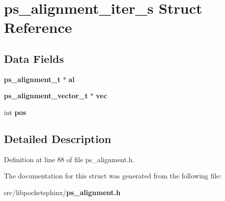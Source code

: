 \section{ps\+\_\+alignment\+\_\+iter\+\_\+s Struct Reference}
\label{structps__alignment__iter__s}
\subsection*{Data Fields}
\begin{DoxyCompactItemize}
\item 
{\bf ps\+\_\+alignment\+\_\+t} $\ast$ {\bfseries al}\label{structps__alignment__iter__s_a853af3f467b7b3e1465f0f1ea273ff3b}

\item 
{\bf ps\+\_\+alignment\+\_\+vector\+\_\+t} $\ast$ {\bfseries vec}\label{structps__alignment__iter__s_abeb4cf9260af4c9ad8d9ee7ba93dec14}

\item 
int {\bfseries pos}\label{structps__alignment__iter__s_a0d993e2df741893ac15b8e84bac32ca6}

\end{DoxyCompactItemize}


\subsection{Detailed Description}


Definition at line 88 of file ps\+\_\+alignment.\+h.



The documentation for this struct was generated from the following file\+:\begin{DoxyCompactItemize}
\item 
src/libpocketsphinx/{\bf ps\+\_\+alignment.\+h}\end{DoxyCompactItemize}
